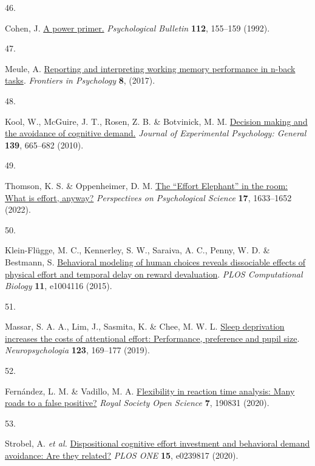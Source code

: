 \documentclass[
  man,floatsintext]{apa6}
\newlength{\cslhangindent}
\newlength{\csllabelwidth}
\newlength{\cslentryspacingunit} %
\newenvironment{CSLReferences}[2] %
 {%
  \setlength{\parindent}{0pt}
  \ifodd #1
  \let\oldpar\par
  \def\par{\hangindent=\cslhangindent\oldpar}
  \fi
  \setlength{\parskip}{#2\cslentryspacingunit}
 }%
 {}
\newcommand{\CSLLeftMargin}[1]{\parbox[t]{\csllabelwidth}{#1}}
\newcommand{\CSLRightInline}[1]{\parbox[t]{\linewidth - \csllabelwidth}{#1}\break}
\begin{document}
\begin{CSLReferences}{0}{0}
\leavevmode{}%
\CSLLeftMargin{46. }%
\CSLRightInline{Cohen, J. \href{https://doi.org/10.1037/0033-2909.112.1.155}{A power primer.} \emph{Psychological Bulletin} \textbf{112}, 155--159 (1992).}

\leavevmode{}%
\CSLLeftMargin{47. }%
\CSLRightInline{Meule, A. \href{https://doi.org/10.3389/fpsyg.2017.00352}{Reporting and interpreting working memory performance in n-back tasks}. \emph{Frontiers in Psychology} \textbf{8}, (2017).}

\leavevmode{}%
\CSLLeftMargin{48. }%
\CSLRightInline{Kool, W., McGuire, J. T., Rosen, Z. B. \& Botvinick, M. M. \href{https://doi.org/10.1037/a0020198}{Decision making and the avoidance of cognitive demand.} \emph{Journal of Experimental Psychology: General} \textbf{139}, 665--682 (2010).}

\leavevmode{}%
\CSLLeftMargin{49. }%
\CSLRightInline{Thomson, K. S. \& Oppenheimer, D. M. \href{https://doi.org/10.1177/17456916211064896}{The {``}{E}ffort {E}lephant{''} in the room: {W}hat is effort, anyway?} \emph{Perspectives on Psychological Science} \textbf{17}, 1633--1652 (2022).}

\leavevmode{}%
\CSLLeftMargin{50. }%
\CSLRightInline{Klein-Flügge, M. C., Kennerley, S. W., Saraiva, A. C., Penny, W. D. \& Bestmann, S. \href{https://doi.org/10.1371/journal.pcbi.1004116}{Behavioral modeling of human choices reveals dissociable effects of physical effort and temporal delay on reward devaluation}. \emph{{PLOS} Computational Biology} \textbf{11}, e1004116 (2015).}

\leavevmode{}%
\CSLLeftMargin{51. }%
\CSLRightInline{Massar, S. A. A., Lim, J., Sasmita, K. \& Chee, M. W. L. \href{https://doi.org/10.1016/j.neuropsychologia.2018.03.032}{Sleep deprivation increases the costs of attentional effort: Performance, preference and pupil size}. \emph{Neuropsychologia} \textbf{123}, 169--177 (2019).}

\leavevmode{}%
\CSLLeftMargin{52. }%
\CSLRightInline{Fernández, L. M. \& Vadillo, M. A. \href{https://doi.org/10.1098/rsos.190831}{Flexibility in reaction time analysis: Many roads to a false positive?} \emph{Royal Society Open Science} \textbf{7}, 190831 (2020).}

\leavevmode{}%
\CSLLeftMargin{53. }%
\CSLRightInline{Strobel, A. \emph{et al.} \href{https://doi.org/10.1371/journal.pone.0239817}{Dispositional cognitive effort investment and behavioral demand avoidance: {Are} they related?} \emph{PLOS ONE} \textbf{15}, e0239817 (2020).}


\end{CSLReferences}
\end{document}
